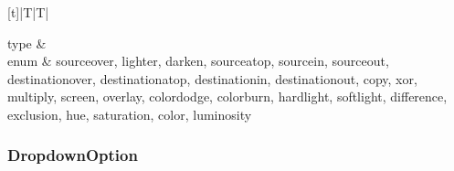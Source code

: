 \documentclass[letterpaper,10pt,english,openany,oneside]{sphinxmanual}
\begin{document}
\begin{savenotes}\sphinxattablestart
\centering
\begin{tabulary}{\linewidth}[t]{|T|T|}
\hline

\sphinxAtStartPar
type
&
\sphinxAtStartPar
{}
\\
\hline
\sphinxAtStartPar
enum
&
\sphinxAtStartPar
source\sphinxhyphen{}over, lighter, darken, source\sphinxhyphen{}atop, source\sphinxhyphen{}in, source\sphinxhyphen{}out, destination\sphinxhyphen{}over, destination\sphinxhyphen{}atop, destination\sphinxhyphen{}in, destination\sphinxhyphen{}out, copy, xor, multiply, screen, overlay, color\sphinxhyphen{}dodge, color\sphinxhyphen{}burn, hard\sphinxhyphen{}light, soft\sphinxhyphen{}light, difference, exclusion, hue, saturation, color, luminosity
\\
\hline
\end{tabulary}
\par
\sphinxattableend\end{savenotes}


\subsubsection{DropdownOption}
\label{\detokenize{docs/advanced/tmap:dropdownoption}}\label{\detokenize{docs/advanced/tmap:dropdownoption}}
\end{document}

